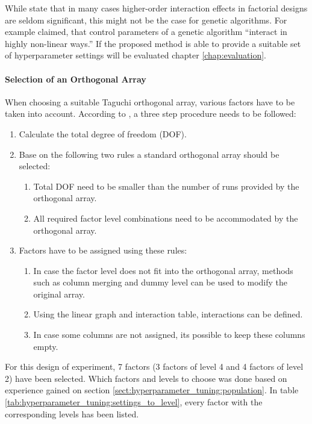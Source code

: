While \cite{yang_design_2009} state that in many cases higher-order interaction effects in factorial designs are seldom significant, this might not be the case for genetic algorithms. For example \cite{kacprzyk_parameter_2007} claimed, that control parameters of a genetic algorithm \enquote{interact in highly non-linear ways.} If the proposed method is able to provide a suitable set of hyperparameter settings will be evaluated chapter \ref{chap:evaluation}. 

\paragraph{Selection of an Orthogonal Array}
When choosing a suitable Taguchi orthogonal array, various factors have to be taken into account. According to \cite{yang_design_2009}, a three step procedure needs to be followed:

\begin{enumerate}
	\item Calculate the total degree of freedom (DOF). 
	\item Base on the following two rules a standard orthogonal array should be selected:
	\begin{enumerate}
		\item Total DOF need to be smaller than the number of runs provided by the orthogonal array.
		\item All required factor level combinations need to be accommodated by the orthogonal array.
	\end{enumerate}
	
	\item Factors have to be assigned using these rules: 
	\begin{enumerate}
		\item In case the factor level does not fit into the orthogonal array, methods such as column merging and dummy level can be used to modify the original array.
		\item Using the linear graph and interaction table, interactions can be defined. 
		\item In case some columns are not assigned, its possible to keep these columns empty.
	\end{enumerate}
\end{enumerate}

For this design of experiment, 7 factors (3 factors of level 4 and 4 factors of level 2) have been selected. Which factors and levels to choose was done based on experience gained on section \ref{sect:hyperparameter_tuning:population}. In table \ref{tab:hyperparameter_tuning:settings_to_level}, every factor with the corresponding levels has been listed.

